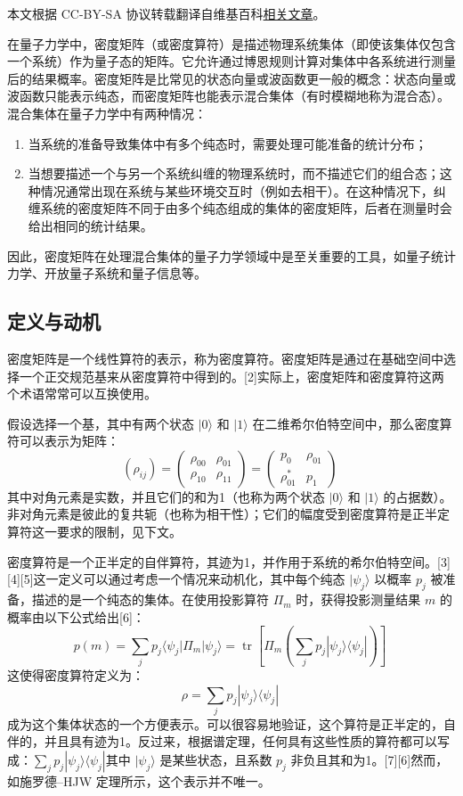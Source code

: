 
本文根据 CC-BY-SA 协议转载翻译自维基百科\href{https://en.wikipedia.org/wiki/Density_matrix}{相关文章}。

在量子力学中，密度矩阵（或密度算符）是描述物理系统集体（即使该集体仅包含一个系统）作为量子态的矩阵。它允许通过博恩规则计算对集体中各系统进行测量后的结果概率。密度矩阵是比常见的状态向量或波函数更一般的概念：状态向量或波函数只能表示纯态，而密度矩阵也能表示混合集体（有时模糊地称为混合态）。混合集体在量子力学中有两种情况：
\begin{enumerate}
\item 当系统的准备导致集体中有多个纯态时，需要处理可能准备的统计分布；
\item 当想要描述一个与另一个系统纠缠的物理系统时，而不描述它们的组合态；这种情况通常出现在系统与某些环境交互时（例如去相干）。在这种情况下，纠缠系统的密度矩阵不同于由多个纯态组成的集体的密度矩阵，后者在测量时会给出相同的统计结果。
\end{enumerate}
因此，密度矩阵在处理混合集体的量子力学领域中是至关重要的工具，如量子统计力学、开放量子系统和量子信息等。
\subsection{定义与动机}
密度矩阵是一个线性算符的表示，称为密度算符。密度矩阵是通过在基础空间中选择一个正交规范基来从密度算符中得到的。[2]实际上，密度矩阵和密度算符这两个术语常常可以互换使用。

假设选择一个基，其中有两个状态 \(|0\rangle\) 和 \(|1\rangle\) 在二维希尔伯特空间中，那么密度算符可以表示为矩阵：
\[
(\rho_{ij}) = \left( \begin{matrix} \rho_{00} & \rho_{01} \\ \rho_{10} & \rho_{11} \end{matrix} \right) = \left( \begin{matrix} p_0 & \rho_{01} \\ \rho_{01}^* & p_1 \end{matrix} \right)~
\]
其中对角元素是实数，并且它们的和为1（也称为两个状态 \(|0\rangle\) 和 \(|1\rangle\) 的占据数）。非对角元素是彼此的复共轭（也称为相干性）；它们的幅度受到密度算符是正半定算符这一要求的限制，见下文。

密度算符是一个正半定的自伴算符，其迹为1，并作用于系统的希尔伯特空间。[3][4][5]这一定义可以通过考虑一个情况来动机化，其中每个纯态 \(|\psi_j\rangle\) 以概率 \(p_j\) 被准备，描述的是一个纯态的集体。在使用投影算符 \(\Pi_m\) 时，获得投影测量结果 \(m\) 的概率由以下公式给出[6]：
\[
p(m) = \sum_j p_j \langle \psi_j | \Pi_m | \psi_j \rangle = \operatorname{tr} \left[\Pi_m \left( \sum_j p_j |\psi_j \rangle \langle \psi_j | \right) \right]~
\]
这使得密度算符定义为：
\[
\rho = \sum_j p_j |\psi_j \rangle \langle \psi_j |~
\]
成为这个集体状态的一个方便表示。可以很容易地验证，这个算符是正半定的，自伴的，并且具有迹为1。反过来，根据谱定理，任何具有这些性质的算符都可以写成：\(\sum_j p_j |\psi_j \rangle \langle \psi_j |\)其中 \( |\psi_j \rangle \) 是某些状态，且系数 \(p_j\) 非负且其和为1。[7][6]然而，如施罗德–HJW 定理所示，这个表示并不唯一。

